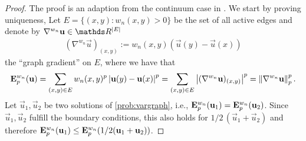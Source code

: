 %
\begin{proof}
The	proof is an adaption from the continuum case in \cite[Thm. 2.16]{lindqvist2017notes}. We start by proving uniqueness, 	
Let $E = \{(x,y): w_n(x,y)>0\}$ be the set of all active edges and denote by $\nabla^{w_n} \vec u \in \R^{\abs{E}}$
%
\begin{align*}
(\nabla^{w_n} \vec u)_{(x,y)} := w_n(x,y) \left(\vec u(y) - \vec u(x)\right)
\end{align*}
%
the \enquote{graph gradient} on $E$, where we have that
%
\begin{align*}
\mathbf{E}^{w_n}_p (\mathbf{u}) = \sum_{(x,y)\in E} w_n(x,y)^p \left|\mathbf{u}(y) - \mathbf{u}(x)\right|^p 
= \sum_{(x,y)\in E} \left|(\nabla^{w_n} \mathbf{u})_{(x,y)}\right|^p=
\left\|\nabla^{w_n}\mathbf{u}\right\|_p^p.	
\end{align*}
%
%
Let $\vec u_1, \vec u_2$ be two  solutions of \cref{prob:vargraph}, i.e., $\mathbf{E}^{w_n}_p (\mathbf{u}_1)= \mathbf{E}^{w_n}_p (\mathbf{u}_2)$. Since $\vec u_1,\vec u_2$ fulfill the boundary conditions, this also holds for $1/2\,(\vec u_1 + \vec u_2)$ and therefore $\mathbf{E}^{w_n}_p(\mathbf{u}_1)\leq\mathbf{E}^{w_n}_p(1/2(\mathbf{u}_1 + \mathbf{u}_2))$.



\end{proof}
